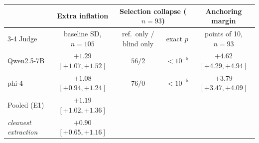 \documentclass[11pt]{article}
\begin{document}
\begin{table}[tbp]
\centering
\small
\setlength{\tabcolsep}{3.5pt}
\begin{tabular}{lcccc}
\toprule
& Extra inflation & \multicolumn{2}{c}{Selection collapse ($n{=}93$)} & Anchoring margin \\
\cmidrule(lr){3-4}
Judge & baseline SD, $n{=}105$ & ref.\ only $/$ blind only & exact $p$ & points of 10, $n{=}93$ \\
\midrule
Qwen2.5-7B & $+1.29$ {\scriptsize$[+1.07, +1.52]$} & $56/2$ & $<10^{-5}$ & $+4.62$ {\scriptsize$[+4.29, +4.94]$} \\
phi-4      & $+1.08$ {\scriptsize$[+0.94, +1.24]$} & $76/0$ & $<10^{-5}$ & $+3.79$ {\scriptsize$[+3.47, +4.09]$} \\
Pooled (E1) & $\mathbf{+1.19}$ {\scriptsize$[+1.02, +1.36]$} & & & \\
\addlinespace[2pt]
\emph{\quad cleanest extraction} & $+0.90$ {\scriptsize$[+0.65, +1.16]$} & & & \\
\bottomrule
\end{tabular}


\end{table}
\end{document}
